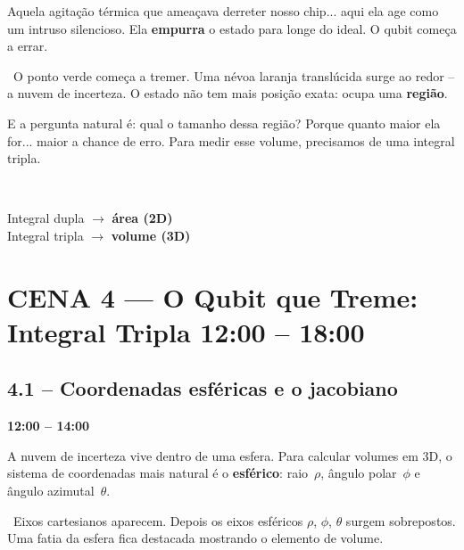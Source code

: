 \documentclass[12pt, a4paper]{article}
\newcommand{\tempo}[1]{%
  \noindent\hfill
  {\small\sffamily\color{corTempo}%
   \faStopwatch\enspace\textbf{#1}}%
  \par\vspace{2pt}%
}
\begin{document}
\begin{fala}
Aquela agitação térmica que ameaçava derreter nosso chip... aqui ela age como
um intruso silencioso. Ela \textbf{empurra} o estado para longe do ideal.
O qubit começa a errar.
\end{fala}

\begin{visual}
\faFilm\ O ponto verde começa a tremer. Uma névoa laranja translúcida surge ao redor
-- a nuvem de incerteza. O estado não tem mais posição exata: ocupa uma \textbf{região}.
\end{visual}

\begin{fala}
E a pergunta natural é: qual o tamanho dessa região?
Porque quanto maior ela for... maior a chance de erro.
Para medir esse volume, precisamos de uma integral tripla.
\end{fala}

\begin{tela}
\faDesktop\
\begin{center}
\large
Integral dupla $\rightarrow$ \textbf{área (2D)}\\[4pt]
Integral tripla $\rightarrow$ \textbf{volume (3D)}
\end{center}
\end{tela}

\section{CENA 4 --- O Qubit que Treme: Integral Tripla \hfill \normalfont\small\color{corTempo}12:00 -- 18:00}

\subsection{4.1 -- Coordenadas esféricas e o jacobiano}
\tempo{12:00 -- 14:00}

\begin{fala}
A nuvem de incerteza vive dentro de uma esfera. Para calcular volumes em 3D,
o sistema de coordenadas mais natural é o \textbf{esférico}: raio~$\rho$,
ângulo polar~$\phi$ e ângulo azimutal~$\theta$.
\end{fala}

\begin{visual}
\faFilm\ Eixos cartesianos aparecem. Depois os eixos esféricos $\rho$, $\phi$, $\theta$
surgem sobrepostos. Uma fatia da esfera fica destacada mostrando o elemento de volume.
\end{visual}
\end{document}
